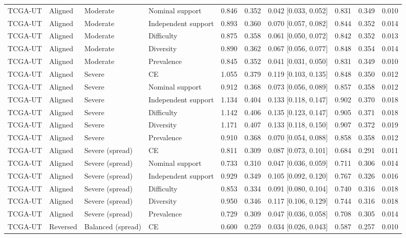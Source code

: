 \begin{longtable}{llllllllll}
TCGA-UT & Aligned & Moderate & Nominal support & 0.846 & 0.352 & 0.042 [0.033, 0.052] & 0.831 & 0.349 & 0.010 \\
TCGA-UT & Aligned & Moderate & Independent support & 0.893 & 0.360 & 0.070 [0.057, 0.082] & 0.844 & 0.352 & 0.014 \\
TCGA-UT & Aligned & Moderate & Difficulty & 0.875 & 0.358 & 0.061 [0.050, 0.072] & 0.842 & 0.352 & 0.013 \\
TCGA-UT & Aligned & Moderate & Diversity & 0.890 & 0.362 & 0.067 [0.056, 0.077] & 0.848 & 0.354 & 0.014 \\
TCGA-UT & Aligned & Moderate & Prevalence & 0.845 & 0.352 & 0.041 [0.031, 0.050] & 0.831 & 0.349 & 0.010 \\
TCGA-UT & Aligned & Severe & CE & 1.055 & 0.379 & 0.119 [0.103, 0.135] & 0.848 & 0.350 & 0.012 \\
TCGA-UT & Aligned & Severe & Nominal support & 0.912 & 0.368 & 0.073 [0.056, 0.089] & 0.857 & 0.358 & 0.012 \\
TCGA-UT & Aligned & Severe & Independent support & 1.134 & 0.404 & 0.133 [0.118, 0.147] & 0.902 & 0.370 & 0.018 \\
TCGA-UT & Aligned & Severe & Difficulty & 1.142 & 0.406 & 0.135 [0.123, 0.147] & 0.905 & 0.371 & 0.018 \\
TCGA-UT & Aligned & Severe & Diversity & 1.171 & 0.407 & 0.133 [0.118, 0.150] & 0.907 & 0.372 & 0.019 \\
TCGA-UT & Aligned & Severe & Prevalence & 0.910 & 0.368 & 0.070 [0.054, 0.088] & 0.858 & 0.358 & 0.012 \\
TCGA-UT & Aligned & Severe (spread) & CE & 0.811 & 0.309 & 0.087 [0.073, 0.101] & 0.684 & 0.291 & 0.011 \\
TCGA-UT & Aligned & Severe (spread) & Nominal support & 0.733 & 0.310 & 0.047 [0.036, 0.059] & 0.711 & 0.306 & 0.014 \\
TCGA-UT & Aligned & Severe (spread) & Independent support & 0.929 & 0.349 & 0.105 [0.092, 0.120] & 0.767 & 0.326 & 0.016 \\
TCGA-UT & Aligned & Severe (spread) & Difficulty & 0.853 & 0.334 & 0.091 [0.080, 0.104] & 0.740 & 0.316 & 0.018 \\
TCGA-UT & Aligned & Severe (spread) & Diversity & 0.950 & 0.346 & 0.117 [0.106, 0.129] & 0.744 & 0.316 & 0.018 \\
TCGA-UT & Aligned & Severe (spread) & Prevalence & 0.729 & 0.309 & 0.047 [0.036, 0.058] & 0.708 & 0.305 & 0.014 \\
TCGA-UT & Reversed & Balanced (spread) & CE & 0.600 & 0.259 & 0.034 [0.026, 0.043] & 0.587 & 0.257 & 0.010 \\

\end{longtable}
